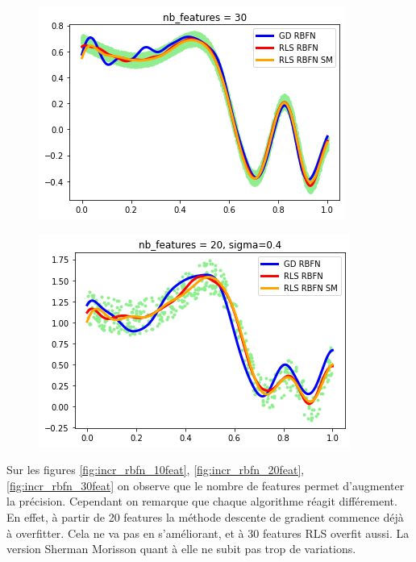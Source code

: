 \documentclass[french,12pt]{article}
\begin{document}
\begin{figure}[ht]
\begin{minipage}{.45\textwidth}
	\includegraphics[width=\textwidth]{incr_rbfn_30feat.png}
	\label{fig:incr_rbfn_30feat}
\end{minipage}
\hfill
\begin{minipage}{.45\textwidth}
	\centering
	\includegraphics[width=\textwidth]{incr_rbfn_sigma.png}
	\label{fig:incr_rbfn_sigma}
\end{minipage}
\end{figure}

Sur les figures \ref{fig:incr_rbfn_10feat}, \ref{fig:incr_rbfn_20feat}, \ref{fig:incr_rbfn_30feat} on observe que le nombre de features permet d'augmenter la précision. Cependant on remarque que chaque algorithme réagit différement. En effet, à partir de 20 features la méthode descente de gradient commence déjà à overfitter. Cela ne va pas en s'améliorant, et à 30 features RLS overfit aussi. La version Sherman Morisson quant à elle ne subit pas trop de variations.
\end{document}
